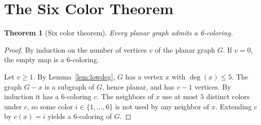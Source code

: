 \documentclass[11pt]{article}
\newtheorem{theorem}{Theorem}
\theoremstyle{definition}
\begin{document}
\section{The Six Color Theorem}

\begin{theorem}[Six color theorem]\label{thm:six}
  Every planar graph admits a 6-coloring.
\end{theorem}

\begin{proof}
  By induction on the number of vertices $v$ of the planar graph $G$. If
  $v = 0$, the empty map is a 6-coloring.

  Let $v \geq 1$. By Lemma~\ref{lem:lowdeg}, $G$ has a vertex $x$ with
  $\deg(x) \leq 5$. The graph $G - x$ is a subgraph of $G$, hence planar,
  and has $v - 1$ vertices. By induction it has a 6-coloring $c$. The
  neighbors of $x$ use at most $5$ distinct colors under $c$, so some color
  $i \in \{1,\dots,6\}$ is not used by any neighbor of $x$. Extending $c$ by
  $c(x) = i$ yields a 6-coloring of $G$.
\end{proof}
\end{document}
